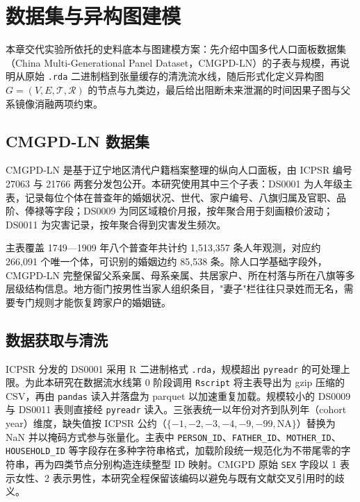 \chapter{数据集与异构图建模}\label{chap:data}

本章交代实验所依托的史料底本与图建模方案：先介绍中国多代人口面板数据集（China Multi-Generational Panel Dataset，CMGPD-LN）的子表与规模，再说明从原始 \texttt{.rda} 二进制档到张量缓存的清洗流水线，随后形式化定义异构图 \(G=(V,E,\mathcal{T},\mathcal{R})\) 的节点与九类边，最后给出阻断未来泄漏的时间因果子图与父系镜像消融两项约束\citep{fey2019pyg,paszke2019pytorch}。

\section{CMGPD-LN 数据集}\label{sec:data-cmgpd}

CMGPD-LN 是基于辽宁地区清代户籍档案整理的纵向人口面板，由 ICPSR 编号 27063 与 21766 两套分发包公开\citep{campbell2011data,zhao2001chinese}。本研究使用其中三个子表：DS0001 为人年级主表，记录每位个体在普查年的婚姻状况、世代、家户编号、八旗归属及官职、品阶、俸禄等字段；DS0009 为同区域粮价月报，按年聚合用于刻画粮价波动；DS0011 为灾害记录，按年聚合得到灾害发生频次。

主表覆盖 1749—1909 年八个普查年共计约 1{,}513{,}357 条人年观测，对应约 266{,}091 个唯一个体，可识别的婚姻边约 85{,}538 条。除人口学基础字段外，CMGPD-LN 完整保留父系亲属、母系亲属、共居家户、所在村落与所在八旗等多层级结构信息。地方衙门按男性当家人组织条目，"妻子"栏往往只录姓而无名，需要专门规则才能恢复跨家户的婚姻链。

\section{数据获取与清洗}\label{sec:data-pipeline}

ICPSR 分发的 DS0001 采用 R 二进制格式 \texttt{.rda}，规模超出 \texttt{pyreadr} 的可处理上限。为此本研究在数据流水线第 0 阶段调用 \texttt{Rscript} 将主表导出为 gzip 压缩的 CSV，再由 \texttt{pandas} 读入并落盘为 parquet 以加速重复加载。规模较小的 DS0009 与 DS0011 表则直接经 \texttt{pyreadr} 读入。三张表统一以年份对齐到队列年（cohort year）维度，缺失值按 ICPSR 公约（$\{-1,-2,-3,-4,-9,-99,\text{NA}\}$）替换为 NaN 并以掩码方式参与张量化。主表中 \texttt{PERSON\_ID}、\texttt{FATHER\_ID}、\texttt{MOTHER\_ID}、\texttt{HOUSEHOLD\_ID} 等字段存在多种字符串格式，加载阶段统一规范化为不带尾零的字符串，再为四类节点分别构造连续整型 ID 映射。CMGPD 原始 \texttt{SEX} 字段以 1 表示女性、2 表示男性，本研究全程保留该编码以避免与既有文献交叉引用时的歧义。

